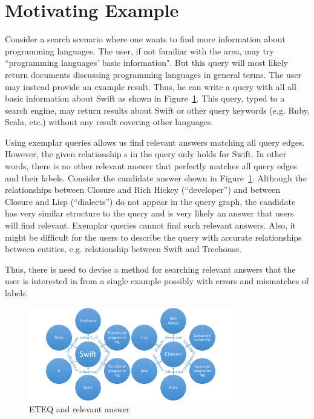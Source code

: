\documentclass{sigmod}
\begin{document}
\section{Motivating Example}
\label{sec:example}
Consider a search scenario where one wants to find more information about programming languages. The user, if not familiar with the area, may try ``programming languages' basic information". But this query will most likely return documents discussing programming languages in general terms. The user may instead provide an example result. Thus, he can write a query with all all basic information about Swift as shown in Figure~\ref{fig:swift-closure}. This query, typed to a search engine, may return results about Swift or other query keywords (e.g. Ruby, Scala, etc.) without any result covering other languages.

Using exemplar queries allows us find relevant answers matching all query edges. However, the given relationship s in the query only holds for Swift. In other words, there is no other relevant answer that perfectly matches all query edges and their labels. Consider the candidate answer shown in Figure~\ref{fig:swift-closure}.  Although the relationships between Closure and Rich Hickey (``developer'') and between Closure and Lisp (``dialects'') do not appear in the query graph, the candidate has very similar structure to the query and is very likely an answer that users will find relevant. Exemplar queries cannot find such relevant answers. Also, it might be difficult for the users to describe the query with accurate relationships between entities, e.g. relationship between Swift and Treehouse. 

Thus, there is need to devise a method for searching relevant answers that the user is interested in from a single example possibly with errors and mismatches of labels.
\begin {figure}
\includegraphics[width=3.5in]{swift.pdf}
\caption{ETEQ and relevant answer}\label{fig:swift-closure}
\end{figure}
\end{document}
